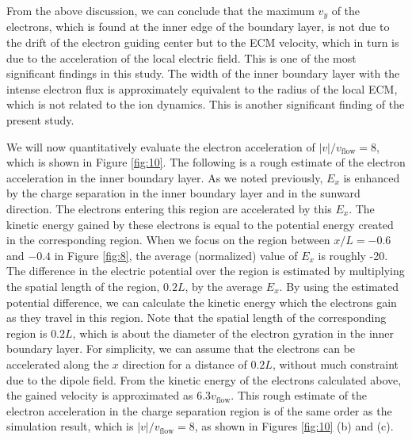 \documentclass[draft,jgrga]{agutex2015}
\begin{document}
\begin{article}

%
%

From the above discussion, 
we can conclude that 
the maximum $v_y$ of the electrons, which is found at the inner edge of the 
boundary layer, is not due to the drift of the electron guiding center
but to the ECM velocity, which in turn is due to the acceleration of the local electric field. 
This is one of the most significant findings in this study.
The width of the inner boundary layer with the intense electron flux 
is approximately equivalent to the radius of the local ECM, 
which is not related to the ion dynamics.
This is another significant finding of the present study.
%
%

We will now quantitatively evaluate the electron acceleration of $|v|/v_\mathrm{flow}=8$, which
is shown in Figure \ref{fig:10}. 
The following is a rough estimate of the electron acceleration in the inner boundary layer.
As we noted previously, 
$E_x$ is enhanced by the charge separation 
in the inner boundary layer and in the sunward direction.
The electrons entering this region are accelerated by this $E_x$.
The kinetic energy gained by these electrons is equal to 
the potential energy created in the corresponding region.
When we focus on the region between $x/L=-0.6$ and $-0.4$ in Figure \ref{fig:8}, 
the average (normalized) value of $E_x$ is roughly -20.
The difference in the electric potential over the region is 
estimated by multiplying the spatial length of the region, 
$0.2 L$, by the average $E_x$.
By using the estimated potential difference, 
we can calculate the kinetic energy which the electrons gain as they travel in this region. 
Note that 
the spatial length of the corresponding region is $0.2 L$, which is about the diameter of 
the electron gyration in the inner boundary layer. 
For simplicity, we can assume that the electrons can be accelerated along the $x$ direction for a distance of $0.2 L$,
without much constraint due to the dipole field.
From the kinetic energy of the electrons calculated above, 
the gained velocity is approximated as $6.3v_\mathrm{flow}$. 
This rough estimate of the electron acceleration in the charge separation region 
is of the same order as the simulation result, which is 
$|v|/v_\mathrm{flow}=8$, as shown in Figures \ref{fig:10} (b) and (c). 


\end{article}
\end{document}
